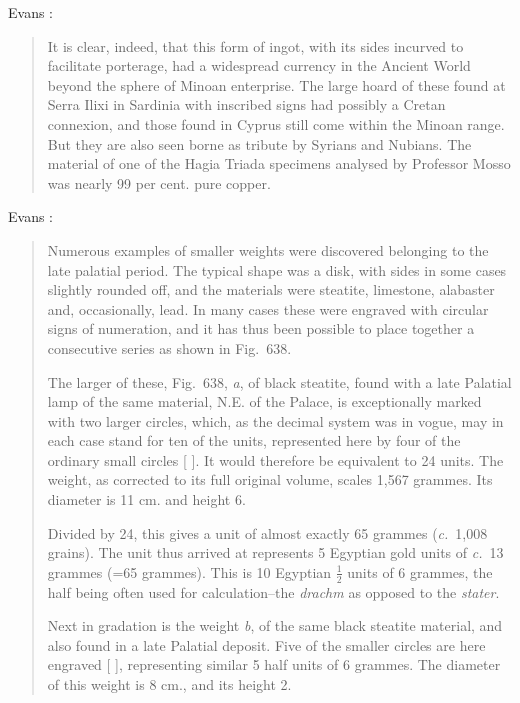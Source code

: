 \documentclass{article}
\begin{document}
Evans \cite[p.~653]{knossosIV2}:

\begin{quote}
It is clear, indeed, that this form of ingot, with its sides incurved to
facilitate porterage, had a widespread currency in the Ancient World beyond
the sphere of Minoan enterprise. The large hoard of these found at Serra
Ilixi in Sardinia with inscribed signs had possibly a Cretan connexion, and
those found in Cyprus still come within the Minoan range. But they are 
also seen borne as tribute by Syrians and Nubians. The material of one
of the Hagia Triada specimens analysed by Professor Mosso was nearly
99 per cent. pure copper.
\end{quote}

Evans \cite[pp.~653--656]{knossosIV2}:

\begin{quote}
Numerous examples of smaller weights were discovered belonging to
the late palatial period. The typical shape was a disk, with sides in some
cases slightly rounded off, and the materials were steatite, limestone,
alabaster and, occasionally, lead. In many cases these were engraved
with circular signs of numeration, and it has thus been possible to place
together a consecutive series as shown in Fig.~638.

The larger of these, Fig.~638, {\em a}, of black steatite, found with a late
Palatial lamp of the same material, N.E. of the Palace, is exceptionally
marked with two larger circles, which, as the decimal system was in vogue,
may in each case stand for ten of the units, represented here by four of the
ordinary small circles [ ]. It would therefore be equivalent to 24 units.
The weight, as corrected to its full original volume, scales 1,567 grammes.
Its diameter is 11 cm. and height 6.

Divided by 24, this gives a unit of almost exactly 65 grammes
({\em c.}~1,008 grains). The unit thus arrived at represents 5 Egyptian gold
units of {\em c.}~13 grammes (=65 grammes). This is 10 Egyptian $\frac{1}{2}$ units of
6 grammes, the half being often used for calculation--the {\em drachm} as
opposed to the {\em stater}.

Next in gradation is the weight {\em b}, of the same black steatite material,
and also found in a late Palatial deposit. Five of the smaller circles are
here engraved [ ], representing similar 5 half units of 6 grammes.
The diameter of this weight is 8 cm., and its height 2.


\end{quote}
\end{document}
